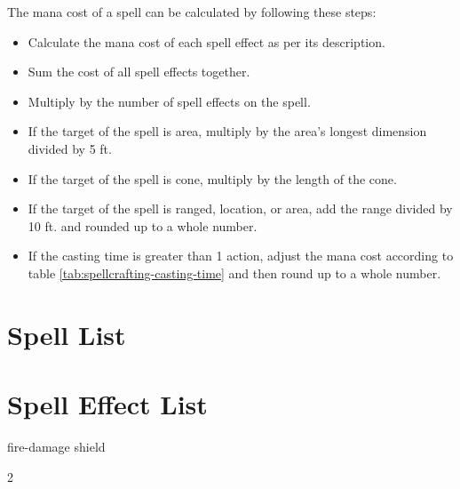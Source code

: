 \begin{multicols*}{2}
    The mana cost of a spell can be calculated by following these steps:
    \begin{itemize}
        \item Calculate the mana cost of each spell effect as per its
            description.
        \item Sum the cost of all spell effects together.
        \item Multiply by the number of spell effects on the spell.
        \item If the target of the spell is area, multiply by the area's
            longest dimension divided by 5 ft.
        \item If the target of the spell is cone, multiply by the length of
            the cone.
        \item If the target of the spell is ranged, location, or area,
            add the range divided by 10 ft. and rounded up to a
            whole number.
        \item If the casting time is greater than 1 action, adjust the mana
            cost according to table \ref{tab:spellcrafting-casting-time} and
            then round up to a whole number.
    \end{itemize}
    
    \section{Spell List}

    \section{Spell Effect List}
    {fire-damage}
    {shield}

\end{multicols*}{2}
